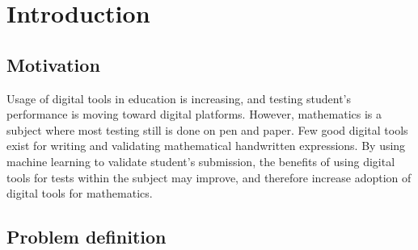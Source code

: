 \chapter{Introduction}

\section{Motivation} %

Usage of digital tools in education is increasing, and testing student's performance is moving toward digital platforms. However, mathematics is a subject where most testing still is done on pen and paper. Few good digital tools exist for writing and validating mathematical handwritten expressions. By using machine learning to validate student's submission, the benefits of using digital tools for tests within the subject may improve, and therefore increase adoption of digital tools for mathematics.






\section{Problem definition} 
\label{problem_definition}




